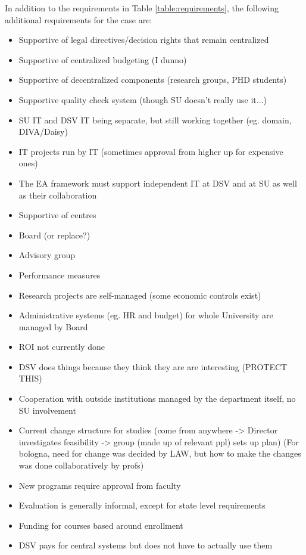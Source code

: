 In addition to the requirements in Table \ref{table:requirements}, the following additional requirements for the case are:
\begin{itemize}


\item Supportive of legal directives/decision rights that remain centralized

\item Supportive of centralized budgeting (I dunno)

\item Supportive of decentralized components (research groups, PHD students)
 

\item Supportive quality check system (though SU doesn't really use it...)

 
\item SU IT and DSV IT being separate, but still working together (eg. domain, DIVA/Daisy)

\item IT projects run by IT (sometimes approval from higher up for expensive ones)

\item The EA framework must support independent IT at DSV and at SU as well as their collaboration

\item Supportive of centres

\item Board (or replace?)

\item Advisory group

\item Performance measures

\item Research projects are self-managed (some economic controls exist)

\item Administrative systems (eg. HR and budget) for whole University are managed by Board

\item ROI not currently done

\item DSV does things because they think they are are interesting (PROTECT THIS)

\item Cooperation with outside institutions managed by the department  itself, no SU involvement

\item Current change structure for studies (come from anywhere -> Director investigates feasibility -> group (made up of relevant ppl) sets up plan) (For bologna, need for change was decided by LAW, but how to make the changes was done collaboratively by profs)

\item New programs require approval from faculty

\item Evaluation is generally informal, except for state level requirements

\item Funding for courses based around enrollment 

\item DSV pays for central systems but does not have to actually use them

\end{itemize}
 
